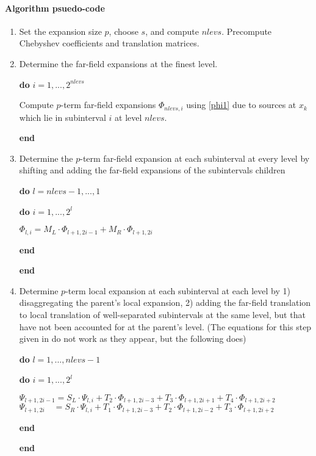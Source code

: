 \paragraph{Algorithm psuedo-code}
\begin{enumerate}
\item Set the expansion size $p$, choose $s$, and compute $nlevs$.  Precompute Chebyshev coefficients and translation matrices.  

\item Determine the far-field expansions at the finest level. 

\textbf{do} $i = 1, ..., 2^{nlevs}$
\begin{addmargin}[1em]{2em}
Compute $p$-term far-field expansions $\Phi_{nlevs,i}$ using \eqref{phi1} due to sources at $x_k$ which lie in subinterval $i$ at level $nlevs$. 
\end{addmargin}
\textbf{end}

\item Determine the $p$-term far-field expansion at each subinterval at every level by shifting and adding the far-field expansions of the subintervals children

\textbf{do} $l = nlevs-1, ..., 1$
\begin{addmargin}[1em]{2em}
\textbf{do} $i = 1, ..., 2^{l}$
\begin{addmargin}[1em]{2em}
$\Phi_{l,i} = M_L \cdot \Phi_{l+1,2i-1}  + M_R \cdot \Phi_{l+1,2i} $
\end{addmargin}
\textbf{end}
\end{addmargin}
\textbf{end}

\item Determine $p$-term local expansion at each subinterval at each level by 1) disaggregating the parent's local expansion, 2) adding the far-field translation to local translation of well-separated subintervals at the same level, but that have not been accounted for at the parent's level. (The equations for this step given in \cite{dutt1996fast} do not work as they appear, but the following does)

\textbf{do} $l = 1,...,nlevs-1$
\begin{addmargin}[1em]{1em}
\textbf{do} $i = 1, ..., 2^{l}$
\begin{addmargin}[1em]{1em}
$\Psi_{l+1,2i-1} = S_L \cdot  \Psi_{l,i} + T_2 \cdot  \Phi_{l+1,2i-3} + T_3  \cdot \Phi_{l+1,2i+1} + T_4 \cdot  \Phi_{l+1,2i+2}$ \\
$\Psi_{l+1,2i} \quad = S_R  \cdot \Psi_{l,i} + T_1 \cdot  \Phi_{l+1,2i-3} + T_2  \cdot \Phi_{l+1,2i-2} + T_3  \cdot \Phi_{l+1,2i+2}$
\end{addmargin}
\textbf{end}
\end{addmargin}
\textbf{end}


\end{enumerate}

